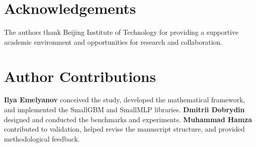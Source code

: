 \documentclass{article}
\begin{document}
\section*{Acknowledgements}

The authors thank Beijing Institute of Technology for providing
a supportive academic environment and opportunities for research
and collaboration.

\section*{Author Contributions}

\textbf{Ilya Emelyanov} conceived the study, developed the mathematical
framework, and implemented the SmallGBM and SmallMLP libraries.
\textbf{Dmitrii Dobrydin} designed and conducted the benchmarks
and experiments.
\textbf{Muhammad Hamza} contributed to validation, helped revise
the manuscript structure, and provided methodological feedback.



\end{document}
